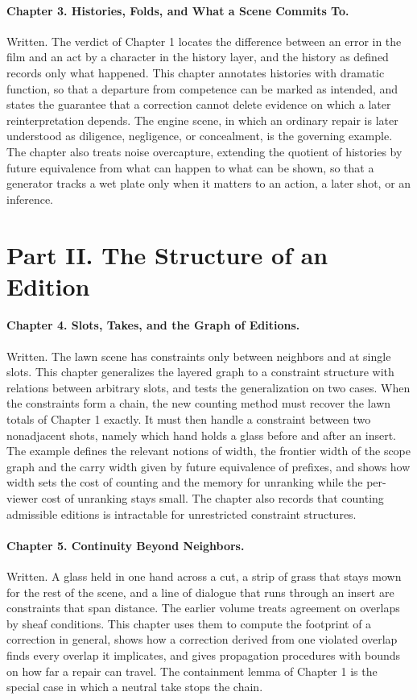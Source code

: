 \documentclass[11pt]{article}
\begin{document}
\paragraph{Chapter 3. Histories, Folds, and What a Scene Commits To.} Written. The verdict of Chapter 1 locates the difference between an error in the film and an act by a character in the history layer, and the history as defined records only what happened. This chapter annotates histories with dramatic function, so that a departure from competence can be marked as intended, and states the guarantee that a correction cannot delete evidence on which a later reinterpretation depends. The engine scene, in which an ordinary repair is later understood as diligence, negligence, or concealment, is the governing example. The chapter also treats noise overcapture, extending the quotient of histories by future equivalence from what can happen to what can be shown, so that a generator tracks a wet plate only when it matters to an action, a later shot, or an inference.

\section*{Part II. The Structure of an Edition}

\paragraph{Chapter 4. Slots, Takes, and the Graph of Editions.} Written. The lawn scene has constraints only between neighbors and at single slots. This chapter generalizes the layered graph to a constraint structure with relations between arbitrary slots, and tests the generalization on two cases. When the constraints form a chain, the new counting method must recover the lawn totals of Chapter 1 exactly. It must then handle a constraint between two nonadjacent shots, namely which hand holds a glass before and after an insert. The example defines the relevant notions of width, the frontier width of the scope graph and the carry width given by future equivalence of prefixes, and shows how width sets the cost of counting and the memory for unranking while the per-viewer cost of unranking stays small. The chapter also records that counting admissible editions is intractable for unrestricted constraint structures.

\paragraph{Chapter 5. Continuity Beyond Neighbors.} Written. A glass held in one hand across a cut, a strip of grass that stays mown for the rest of the scene, and a line of dialogue that runs through an insert are constraints that span distance. The earlier volume treats agreement on overlaps by sheaf conditions. This chapter uses them to compute the footprint of a correction in general, shows how a correction derived from one violated overlap finds every overlap it implicates, and gives propagation procedures with bounds on how far a repair can travel. The containment lemma of Chapter 1 is the special case in which a neutral take stops the chain.
\end{document}
